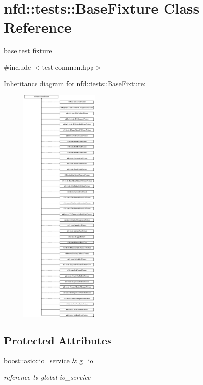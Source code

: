 \hypertarget{classnfd_1_1tests_1_1BaseFixture}{}\section{nfd\+:\+:tests\+:\+:Base\+Fixture Class Reference}
\label{classnfd_1_1tests_1_1BaseFixture}


base test fixture  




{\ttfamily \#include $<$test-\/common.\+hpp$>$}

Inheritance diagram for nfd\+:\+:tests\+:\+:Base\+Fixture\+:\begin{figure}[H]
\begin{center}
\leavevmode
\includegraphics[height=12.000000cm]{classnfd_1_1tests_1_1BaseFixture}
\end{center}
\end{figure}
\subsection*{Protected Attributes}
\begin{DoxyCompactItemize}
\item 
boost\+::asio\+::io\+\_\+service \& \hyperlink{classnfd_1_1tests_1_1BaseFixture_a801a49d615ab6b1999b5739f4c6ff04d}{g\+\_\+io}\hypertarget{classnfd_1_1tests_1_1BaseFixture_a801a49d615ab6b1999b5739f4c6ff04d}{}\label{classnfd_1_1tests_1_1BaseFixture_a801a49d615ab6b1999b5739f4c6ff04d}

\begin{DoxyCompactList}\small\item\em reference to global io\+\_\+service \end{DoxyCompactList}\end{DoxyCompactItemize}



